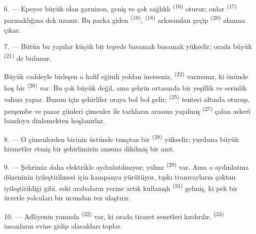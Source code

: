 \VUsaut{5.0mm}
\VUsaut{3.4mm}

6. --- Epeyce büyük olan garnizon, geniş ve çok sağlıklı 
\textsuperscript{(16)} oturur; onlar 
\textsuperscript{(17)} parmaklığına dek uzanır. Bu parka giden
 \textsuperscript{(19)}, 
\textsuperscript{(18)} arkasından geçip 
\textsuperscript{(20)} alanına çıkar.

7. --- Bütün bu yapılar küçük bir tepede basamak basamak yükselir; orada büyük
 \textsuperscript{(21)} de bulunur.

Büyük caddeyle birleşen o hafif eğimli yoldan inerseniz, 
\textsuperscript{(22)} varırsınız, ki önünde hoş bir 
\textsuperscript{(26)} var. Bu  çok büyük değil, ama şehrin
ortasında bir yeşillik ve serinlik vahası yapar. Bunun için şehirliler oraya
bol bol gelir;  \textsuperscript{(25)} tentesi altında
oturup, perşembe ve pazar günleri çimenler ile tarhların arasına yapılmış
 \textsuperscript{(27)} çalan askerî bandoyu dinlemekten
hoşlanırlar.

8. --- O çimenlerden birinin üstünde tunçtan bir 
\textsuperscript{(28)} yükselir; yurduna büyük hizmetler etmiş bir
şehirlimizin anısına dikilmiş bir anıt.

\VUsaut{4.0mm}
\VUsaut{3.4mm}

9. --- Şehrimiz daha elektrikle aydınlatılmıyor; yalnız  \textsuperscript{(29)} var. Ama  o
aydınlatma düzeninin iyileştirilmesi için kampanya yürütüyor, tıpkı
tramvayların  çoktan iyileştirildiği gibi.
  eski arabaların yerine artık kullanışlı
 \textsuperscript{(31)} gelmiş, ki pek
 bir ücretle yolcuları  bir ucundan
 tez ulaştırır.

10. --- Adliyenin yanında  \textsuperscript{(32)} var, ki
orada ticaret senetleri kırdırılır. 
\textsuperscript{(33)} insanların evine gidip alacakları toplar.

\VUsaut{4.0mm}
\VUsaut{3.4mm}

